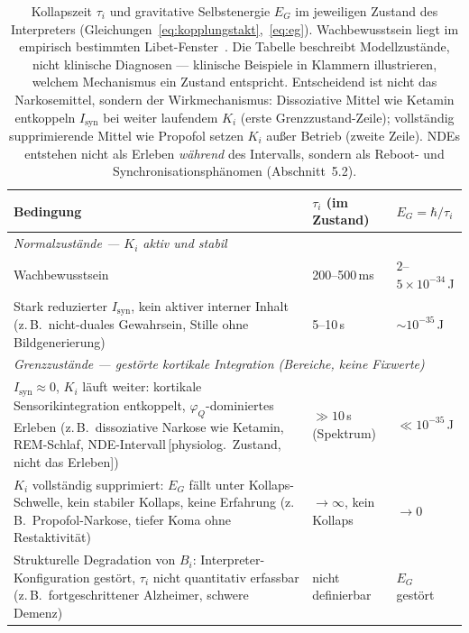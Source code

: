 \documentclass[11pt,a4paper]{article}
\begin{document}
\begin{table}[ht]
\centering
\begin{tabular}{p{7.2cm}p{3.2cm}p{2.8cm}}
\toprule
Bedingung & $\tau_i$ (im Zustand) & $E_G = \hbar/\tau_i$ \\
\midrule
\multicolumn{3}{l}{\textit{Normalzustände — $K_i$ aktiv und stabil}} \\[2pt]
Wachbewusstsein
  & 200–500\,ms
  & $2$–$5\times10^{-34}$\,J \\[4pt]
Stark reduzierter $I_{\mathrm{syn}}$, kein aktiver interner Inhalt
  {\small (z.\,B.\ nicht-duales Gewahrsein, Stille ohne Bildgenerierung)}
  & 5–10\,s
  & ${\sim}10^{-35}$\,J \\[8pt]
\multicolumn{3}{l}{\textit{Grenzzustände — gestörte kortikale Integration (Bereiche, keine Fixwerte)}} \\[2pt]
$I_{\mathrm{syn}}\approx 0$, $K_i$ läuft weiter:
  kortikale Sensorikintegration entkoppelt,
  $\varphi_Q$-dominiertes Erleben
  {\small (z.\,B.\ dissoziative Narkose wie Ketamin,
  REM-Schlaf, NDE-Intervall{\,}[physiolog.\ Zustand, nicht das Erleben])}
  & ${\gg}10$\,s {\small(Spektrum)}
  & ${\ll}10^{-35}$\,J \\[6pt]
$K_i$ vollständig supprimiert:
  $E_G$ fällt unter Kollaps-Schwelle,
  kein stabiler Kollaps, keine Erfahrung
  {\small (z.\,B.\ Propofol-Narkose,
  tiefer Koma ohne Restaktivität)}
  & ${\to}\infty$, kein Kollaps
  & ${\to}0$ \\[6pt]
Strukturelle Degradation von $B_i$:
  Interpreter-Konfiguration gestört,
  $\tau_i$ nicht quantitativ erfassbar
  {\small (z.\,B.\ fortgeschrittener Alzheimer,
  schwere Demenz)}
  & nicht definierbar
  & $E_G$ gestört \\
\bottomrule
\end{tabular}
\caption{Kollapszeit $\tau_i$ und gravitative Selbstenergie $E_G$ im jeweiligen
  Zustand des Interpreters (Gleichungen~\eqref{eq:kopplungstakt},~\eqref{eq:eg}).
  Wachbewusstsein liegt im empirisch bestimmten Libet-Fenster~\citep{libet2004}.
  Die Tabelle beschreibt Modellzustände, nicht klinische Diagnosen —
  klinische Beispiele in Klammern illustrieren, welchem Mechanismus ein
  Zustand entspricht. Entscheidend ist nicht das Narkosemittel, sondern
  der Wirkmechanismus: Dissoziative Mittel wie Ketamin entkoppeln
  $I_{\mathrm{syn}}$ bei weiter laufendem $K_i$ (erste Grenzzustand-Zeile);
  vollständig supprimierende Mittel wie Propofol setzen $K_i$ außer
  Betrieb (zweite Zeile). NDEs entstehen nicht als Erleben
  \emph{während} des Intervalls, sondern als Reboot- und
  Synchronisationsphänomen (Abschnitt~5.2).}
\label{tab:tau}
\end{table}
\end{document}
